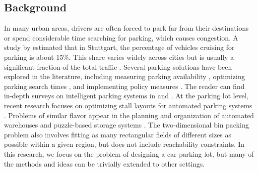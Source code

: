 \documentclass[10pt]{article}
\theoremstyle{definition}
\begin{document}
\subsection{Background}
In many urban areas, drivers are often forced to park far from their destinations or spend considerable time searching for parking, which causes congestion. A study by \cite{hampshire2018share} estimated that in Stuttgart, the percentage of vehicles cruising for parking is about 15\%. This share varies widely across cities but is usually a significant fraction of the total traffic \citep{shoup2006cruising, lee2017cruising}. Several parking solutions have been explored in the literature, including measuring parking availability \citep{parking-ITS-DL, arora2019hard}, optimizing parking search times \citep{tang2014modeling, onstreet-parking-search}, and implementing policy measures \citep{parking-policies}. The reader can find in-depth surveys on intelligent parking systems in \cite{lin2017survey} and \cite{smart-parking-city}. At the parking lot level, recent research focuses on optimizing stall layouts for automated parking systems \citep{wu2019optimal, scheduling-unmanned-parking, automated-vehicles-parking, puzzle-parking-design, automated-valet-parking, wang2021, chen2023}. Problems of similar flavor appear in the planning and organization of automated warehouses and puzzle-based storage systems \citep{flake2002rush, gue2007puzzle, azadeh2019robotized, bukchin2022comprehensive, rosenfeld2022optimal, raviv2023optimal}. The two-dimensional bin packing problem \citep{lodi2002, pisinger2007} also involves fitting as many rectangular fields of different sizes as possible within a given region, but does not include reachability constraints. In this research, we focus on the problem of designing a car parking lot, but many of the methods and ideas can be trivially extended to other settings.
\end{document}
